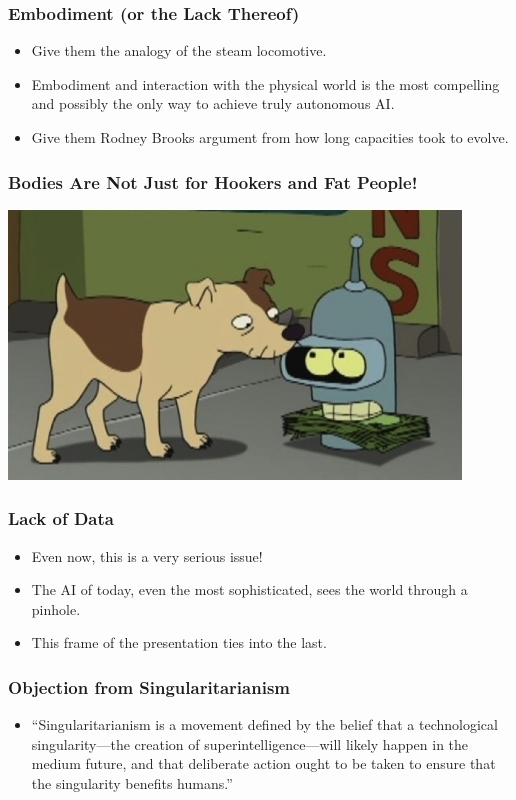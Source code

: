\documentclass[10pt]{beamer}
\begin{document}
  \begin{frame}
    \frametitle{Embodiment (or the Lack Thereof)}

    \begin{itemize}
      \item Give them the analogy of the steam locomotive.
      \pause
      \item Embodiment and interaction with the physical world is the most
        compelling and possibly the only way to achieve truly autonomous AI.
      \pause
      \item Give them Rodney Brooks argument from how long capacities took to
        evolve.
    \end{itemize}
  \end{frame}

  \begin{frame}
    \frametitle{Bodies Are Not Just for Hookers and Fat People!}

    \includegraphics[width=0.9\textwidth]{bender-without-body.jpg}
  \end{frame}

  \begin{frame}
    \frametitle{Lack of Data}

    \begin{itemize}
      \item Even now, this is a very serious issue!
      \pause
      \item The AI of today, even the most sophisticated, sees the world
        through a pinhole.
      \pause
      \item This frame of the presentation ties into the last.
    \end{itemize}
  \end{frame}

  \begin{frame}
    \frametitle{Objection from Singularitarianism}

    \begin{itemize}
      \item ``Singularitarianism is a movement defined by the belief that a
        technological singularity---the creation of superintelligence---will
        likely happen in the medium future, and that deliberate action ought
        to be taken to ensure that the singularity benefits humans.''
    \end{itemize}
  \end{frame}
\end{document}
